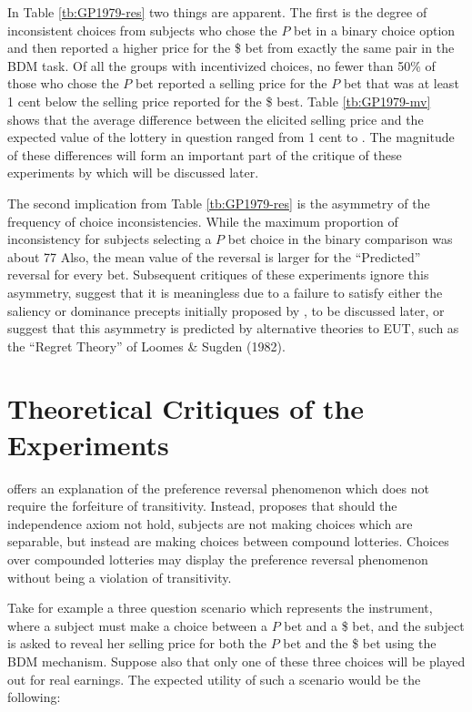 \documentclass[../main.tex]{subfiles}
\begin{document}
In Table \ref{tb:GP1979-res} two things are apparent.
The first is the degree of inconsistent choices from subjects who chose the $P$ bet in a binary choice option and then reported a higher price for the \$ bet from exactly the same pair in the BDM task.
Of all the groups with incentivized choices, no fewer than 50\% of those who chose the $P$ bet reported a selling price for the $P$ bet that was at least 1 cent below the selling price reported for the \$ best.
Table \ref{tb:GP1979-mv} shows that the average difference between the elicited selling price and the expected value of the lottery in question ranged from 1 cent to .
The magnitude of these differences will form an important part of the critique of these experiments by \textcite{Harrison1989, Harrison1992} which will be discussed later.

The second implication from Table \ref{tb:GP1979-res} is the asymmetry of the frequency of choice inconsistencies.
While the maximum proportion of inconsistency for subjects selecting a $P$ bet choice in the binary comparison was about 77%
Also, the  mean value of the reversal is larger for the \enquote{Predicted} reversal for every bet.
Subsequent critiques of these experiments ignore this asymmetry, suggest that it is meaningless due to a failure to satisfy either the saliency or dominance precepts initially proposed by \textcite{Smith1982}, to be discussed later, or suggest that this asymmetry is predicted by alternative theories to EUT, such as the \enquote{Regret Theory} of  Loomes \& Sugden (1982).

\section{Theoretical Critiques of the \texorpdfstring{\textcite{Grether1979}}{Grether \& Plott (1979)} Experiments}

\textcite{Holt1986} offers an explanation of the preference reversal phenomenon which does not require the forfeiture of transitivity.
Instead, \textcite{Holt1986} proposes that should the independence axiom not hold, subjects are not making choices which are separable, but instead are making choices between compound lotteries.
Choices over compounded lotteries may display the preference reversal phenomenon without being a violation of transitivity.

Take for example a three question scenario which represents the \textcite{Grether1979} instrument, where a subject must make a choice between a $P$ bet and a \$ bet, and the subject is asked to reveal her selling price for both the $P$ bet and the \$ bet using the BDM mechanism.
Suppose also that only one of these three choices will be played out for real earnings.
The expected utility of such a scenario would be the following:
\end{document}
